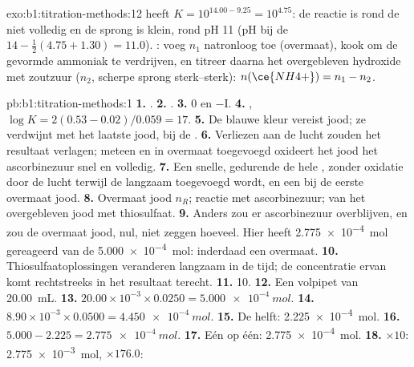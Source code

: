 \begin{solution}{exo:b1:titration-methods:12}
 heeft $K = 10^{14.00 - 9.25} = 10^{4.75}$:
de reactie is rond de  niet volledig en de sprong is klein,
rond pH 11 (pH bij de  $14 - \frac12(4.75 + 1.30) = 11.0$).
: voeg $n_1$ natronloog toe (overmaat), kook om de gevormde
ammoniak te verdrijven, en titreer daarna het overgebleven hydroxide met
zoutzuur ($n_2$, scherpe sprong sterk--sterk): $n(\ce{NH4+}) = n_1 - n_2$.
\end{solution}

\begin{solution}{pb:b1:titration-methods:1}
\textbf{1.} .
\textbf{2.} .
\textbf{3.} 0 en $-$I.
\textbf{4.} , $\log K = 2(0.53 - 0.02)/0.059
= 17$.
\textbf{5.} De blauwe kleur vereist jood; ze verdwijnt met het laatste
jood, bij de .
\textbf{6.} Verliezen aan de lucht zouden het resultaat verlagen; meteen
en in overmaat toegevoegd oxideert het jood het ascorbinezuur snel en
volledig.
\textbf{7.} Een snelle,  gedurende de hele
, zonder oxidatie door de lucht terwijl de  langzaam
toegevoegd wordt, en een  bij de eerste overmaat jood.
\textbf{8.} Overmaat jood $n_R$; reactie met ascorbinezuur;  van
het overgebleven jood met thiosulfaat.
\textbf{9.} Anders zou er ascorbinezuur overblijven, en zou de overmaat
jood, nul, niet zeggen hoeveel. Hier heeft
\qty{2.775e-4}{mol} gereageerd van de \qty{5.000e-4}{mol}: inderdaad een
overmaat.
\textbf{10.} Thiosulfaatoplossingen veranderen langzaam in de tijd; de
concentratie ervan komt rechtstreeks in het resultaat terecht.
\textbf{11.} 10.
\textbf{12.} Een volpipet van \qty{20.00}{mL}.
\textbf{13.} $20.00 \times 10^{-3} \times 0.0250 = \qty{5.000e-4}{mol}$.
\textbf{14.} $8.90 \times 10^{-3} \times 0.0500 = \qty{4.450e-4}{mol}$.
\textbf{15.} De helft: \qty{2.225e-4}{mol}.
\textbf{16.} $5.000 - 2.225 = \qty{2.775e-4}{mol}$.
\textbf{17.} Eén op één: \qty{2.775e-4}{mol}.
\textbf{18.} $\times 10$: \qty{2.775e-3}{mol}, $\times 176.0$:

\end{solution}
